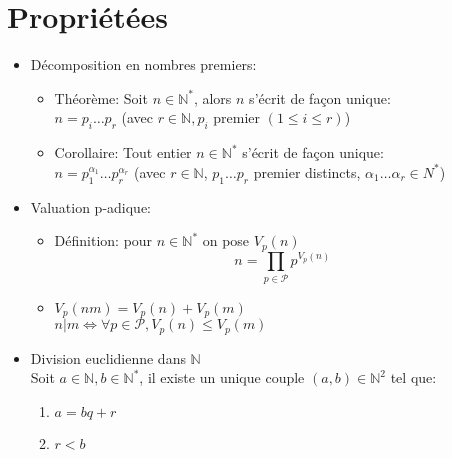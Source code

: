 \documentclass[fleqn]{article}
\begin{document}
\section{Propri\'et\'ees}
\begin{itemize}
	\item D\'ecomposition en nombres premiers:
		\begin{itemize}
			\item Th\'eor\`eme: Soit $n \in \mathbb{N}^*$, alors $n$ s'\'ecrit de fa\c{c}on unique: \\
				$n = p_i \ldots p_r$ (avec $r \in \mathbb{N}, p_i$ premier $(1 \leq i \leq r)$)
			\item Corollaire: Tout entier $n \in \mathbb{N}^*$ s'\'ecrit de fa\c{c}on unique: \\
				$n = p_1^{\alpha_1} \ldots p_r^{\alpha_r}$ (avec $r \in \mathbb{N}$,
				$p_1 \ldots p_r$ premier distincts, $\alpha_1 \ldots \alpha_r \in {N}^*$)
		\end{itemize}
	\item Valuation p-adique:
		\begin{itemize}
			\item D\'efinition: pour $n \in \mathbb{N}^*$ on pose $V_p(n)$ \\
				\[n = \prod_{p \in \mathcal{P}} p^{V_p(n)}\]
			\item $V_p(nm) = V_p(n) + V_p(m)$ \\
				$n|m \Leftrightarrow \forall p \in \mathcal{P}, V_p(n) \leq V_p(m)$
		\end{itemize}
	\item Division euclidienne dans $\mathbb{N}$ \\
		Soit $a \in \mathbb{N}, b \in \mathbb{N}^*$, il existe un unique couple $(a,b) \in \mathbb{N}^2$ tel que:
		\begin{enumerate}
			\item $a = bq + r$
			\item $r < b$
		\end{enumerate}
\end{itemize}
\end{document}
